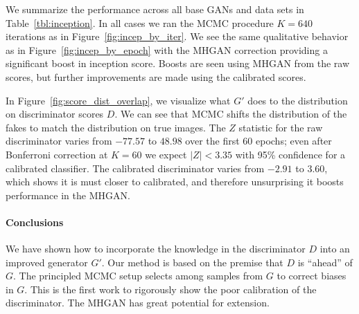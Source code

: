 \documentclass{article}
\begin{document}
We summarize the performance across all base GANs and data sets in Table~\ref{tbl:inception}.
In all cases we ran the MCMC procedure $K=640$ iterations as in Figure~\ref{fig:incep_by_iter}.
We see the same qualitative behavior as in Figure~\ref{fig:incep_by_epoch} with the MHGAN correction providing a significant boost in inception score.
Boosts are seen using MHGAN from the raw scores, but further improvements are made using the calibrated scores.

In Figure~\ref{fig:score_dist_overlap}, we visualize what $G'$ does to the distribution on discriminator scores $D$.
We can see that MCMC shifts the distribution of the fakes to match the distribution on true images.
The $Z$ statistic for the raw discriminator varies from $-77.57$ to $48.98$ over the first 60 epochs; even after Bonferroni correction at $K=60$ we expect $|Z| < 3.35$ with 95\% confidence for a calibrated classifier.
The calibrated discriminator varies from $-2.91$ to $3.60$, which shows it is must closer to calibrated, and therefore unsurprising it boosts performance in the MHGAN\@.

\paragraph{Conclusions}
We have shown how to incorporate the knowledge in the discriminator $D$ into an improved generator $G'$.
Our method is based on the premise that $D$ is ``ahead'' of $G$.
The principled MCMC setup selects among samples from $G$ to correct biases in $G$.
This is the first work to rigorously show the poor calibration of the discriminator.
The MHGAN has great potential for extension.  %


\end{document}
